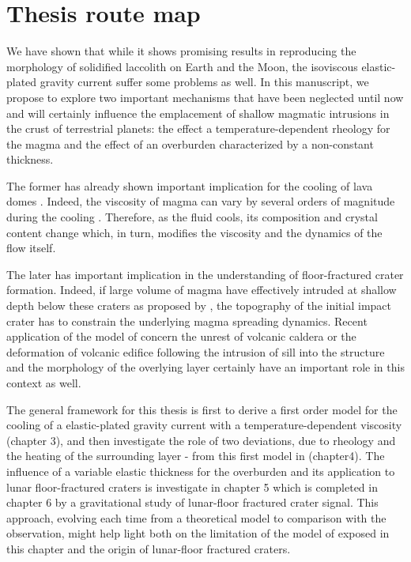 \section{Thesis route map}
\label{C2-sec:discussion}

We have shown that while it shows promising results in reproducing the
morphology  of  solidified  laccolith  on  Earth  and  the  Moon,  the
isoviscous  elastic-plated gravity  current  suffer  some problems  as
well.   In  this  manuscript,  we propose  to  explore  two  important
mechanisms  that have  been  neglected until  now  and will  certainly
influence the emplacement of shallow  magmatic intrusions in the crust
of terrestrial  planets: the  effect a  temperature-dependent rheology
for  the magma  and the  effect of  an overburden  characterized by  a
non-constant thickness.

The former has already shown  important implication for the cooling of
lava                                                             domes
\citep{Bercovici:2007vc,Bercovici:1996uu,BALMFORTH:1999ey,Garel:2014era}. Indeed,
the viscosity of magma can vary  by several orders of magnitude during
the cooling  \citep{Anonymous:CZVBrBvv,Lejeune:1995fc}.  Therefore, as
the fluid cools, its composition  and crystal content change which, in
turn, modifies the viscosity and the dynamics of the flow itself.

The  later   has  important   implication  in  the   understanding  of
floor-fractured crater  formation.  Indeed,  if large volume  of magma
have  effectively intruded  at shallow  depth below  these craters  as
proposed  by \citet{Schultz:1976kt},  the  topography  of the  initial
impact  crater  has  to   constrain  the  underlying  magma  spreading
dynamics. Recent  application of  the model  of \citet{Michaut:2011kg}
concern the unrest of volcanic  caldera or the deformation of volcanic
edifice   following  the   intrusion  of   sill  into   the  structure
\citep{Anonymous:2014jr,Macedonio:2014hh}  and the  morphology of  the
overlying layer  certainly have an  important role in this  context as
well.

The general framework for this thesis is first to derive a first order
model  for the  cooling of  a  elastic-plated gravity  current with  a
temperature-dependent viscosity (chapter 3),  and then investigate the
role  of two  deviations,  due  to rheology  and  the  heating of  the
surrounding layer - from this first model in (chapter4). The influence
of a variable elastic thickness for the overburden and its application
to lunar floor-fractured craters is  investigate in chapter 5 which is
completed  in  chapter  6  by a  gravitational  study  of  lunar-floor
fractured crater  signal.  This  approach, evolving  each time  from a
theoretical model to comparison with the observation, might help light
both on the limitation of  the model of \citep{Michaut:2011kg} exposed
in this chapter and the origin of lunar-floor fractured craters.



\newpage





